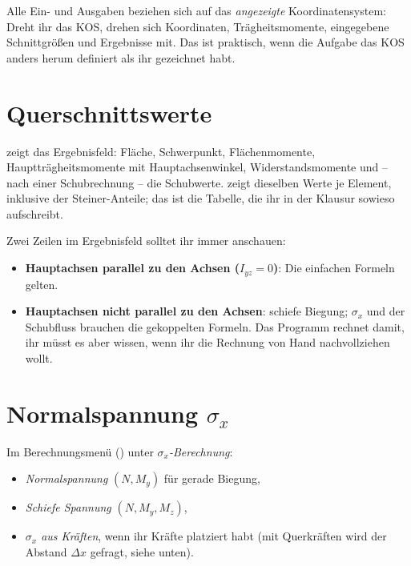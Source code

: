 Alle Ein- und Ausgaben beziehen sich auf das \emph{angezeigte} Koordinatensystem: Dreht ihr das
KOS, drehen sich Koordinaten, Trägheitsmomente, eingegebene Schnittgrößen und Ergebnisse mit.
Das ist praktisch, wenn die Aufgabe das KOS anders herum definiert als ihr gezeichnet habt.

\section{Querschnittswerte}

 zeigt das Ergebnisfeld: Fläche, Schwerpunkt, Flächenmomente, Hauptträgheitsmomente mit
Hauptachsenwinkel, Widerstandsmomente und -- nach einer Schubrechnung -- die Schubwerte.
 zeigt dieselben Werte je Element, inklusive der Steiner-Anteile; das ist die Tabelle,
die ihr in der Klausur sowieso aufschreibt.

Zwei Zeilen im Ergebnisfeld solltet ihr immer anschauen:

\begin{itemize}
  \item \textcolor{green!50!black}{\textbf{Hauptachsen parallel zu den Achsen ($I_{yz} = 0$)}}:
        Die einfachen Formeln gelten.
  \item \textcolor{orange!80!black}{\textbf{Hauptachsen nicht parallel zu den Achsen}}:
        schiefe Biegung; $\sigma_x$ und der Schubfluss brauchen die gekoppelten Formeln. Das
        Programm rechnet damit, ihr müsst es aber wissen, wenn ihr die Rechnung von Hand
        nachvollziehen wollt.
\end{itemize}


\section{\texorpdfstring{Normalspannung $\sigma_x$}{Normalspannung sigma-x}}

Im Berechnungsmenü () unter \emph{$\sigma_x$-Berechnung}:

\begin{itemize}
  \item \emph{Normalspannung} $(N, M_y)$ für gerade Biegung,
  \item \emph{Schiefe Spannung} $(N, M_y, M_z)$,
  \item \emph{$\sigma_x$ aus Kräften}, wenn ihr Kräfte platziert habt (mit Querkräften wird der
        Abstand $\Delta x$ gefragt, siehe unten).
\end{itemize}


